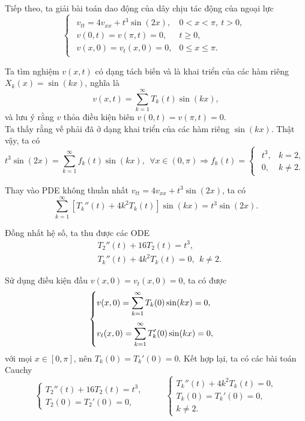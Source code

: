 \documentclass[10pt, a4paper]{article}
\begin{document}
	Tiếp theo, ta giải bài toán dao động của dây chịu tác động của ngoại lực $$\begin{cases}
		\begin{array}{ll}
			v_{tt}=4v_{xx}+t^3\sin(2x), & 0<x<\pi,~t>0, \\
			v(0,t)=v(\pi,t)=0, & t\ge0,\\
			v(x,0)=v_t(x,0)=0, & 0\le x\le\pi.
		\end{array}
	\end{cases}$$
	
	Ta tìm nghiệm $v(x,t)$ có dạng tách biến và là khai triển của các hàm riêng $X_k(x)=\sin(kx)$, nghĩa là $$v(x,t)=\sum_{k=1}^\infty T_k(t)\sin(kx),$$
	và lưu ý rằng $v$ thỏa điều kiện biên $v(0,t)=v(\pi,t)=0$.\\
	
	Ta thấy rằng vế phải đã ở dạng khai triển của các hàm riêng $\sin(kx)$. Thật vậy, ta có $$t^3\sin(2x)=\sum_{k=1}^\infty f_k(t)\sin(kx),~~\forall x\in(0,\pi)\Rightarrow f_k(t)=\begin{cases}
		\begin{array}{ll}
			t^3, & k=2, \\
			0, & k\ne2.
		\end{array}
	\end{cases}$$
	
	Thay vào PDE không thuần nhất $v_{tt}=4v_{xx}+t^3\sin(2x)$, ta có $$\sum_{k=1}^\infty[T_k''(t)+4k^2T_k(t)]\sin(kx)=t^3\sin(2x).$$
	
	Đồng nhất hệ số, ta thu được các ODE \begin{align*}
		&T_2''(t)+16T_2(t)=t^3,\\
		&T_k''(t)+4k^2T_k(t)=0,~~k\ne2.
	\end{align*}
	
	Sử dụng điều kiện đầu $v(x,0)=v_t(x,0)=0$, ta có được $$\begin{cases}
		v(x,0)=\displaystyle\sum_{k=1}^\infty T_k(0)\sin(kx)=0,\\
		\noalign{\vskip7pt}
		v_t(x,0)=\displaystyle\sum_{k=1}^\infty T_k'(0)\sin(kx)=0,
	\end{cases}$$
	với mọi $x\in[0,\pi]$, nên $T_k(0)=T_k'(0)=0$. Kết hợp lại, ta có các bài toán Cauchy $$\begin{cases}
		T_2''(t)+16T_2(t)=t^3,\\
		T_2(0)=T_2'(0)=0,
	\end{cases}\hspace{1cm}\begin{cases}
		T_k''(t)+4k^2T_k(t)=0,\\
		T_k(0)=T_k'(0)=0,\\
		k\ne2.
	\end{cases}$$
	
\end{document}
